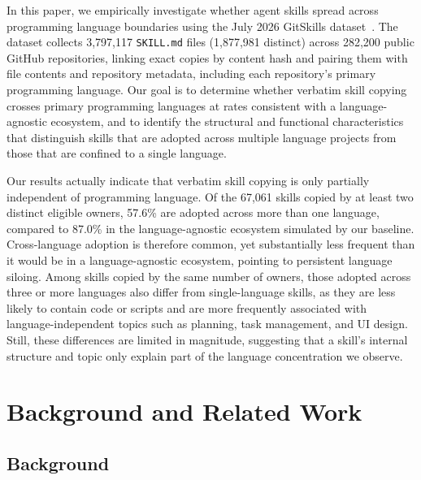 In this paper, we empirically investigate whether agent skills spread across programming language boundaries using the July 2026 GitSkills dataset~\cite{destefanis2027gitskills}. The dataset collects 3,797,117 \texttt{SKILL.md} files (1,877,981 distinct) across 282,200 public GitHub repositories, linking exact copies by content hash and pairing them with file contents and repository metadata, including each repository's primary programming language. Our goal is to determine whether verbatim skill copying crosses primary programming languages at rates consistent with a language-agnostic ecosystem, and to identify the structural and functional characteristics that distinguish skills that are adopted across multiple language projects from those that are confined to a single language.

Our results actually indicate that verbatim skill copying is only partially independent of programming language. Of the 67,061 skills copied by at least two distinct eligible owners, 57.6\% are adopted across more than one language, compared to 87.0\% in the language-agnostic ecosystem simulated by our baseline. Cross-language adoption is therefore common, yet substantially less frequent than it would be in a language-agnostic ecosystem, pointing to persistent language siloing. Among skills copied by the same number of owners, those adopted across three or more languages also differ from single-language skills, as they are less likely to contain code or scripts and are more frequently associated with language-independent topics such as planning, task management, and UI design. Still, these differences are limited in magnitude, suggesting that a skill's internal structure and topic only explain part of the language concentration we observe.

\section{Background and Related Work}

\subsection{Background}

